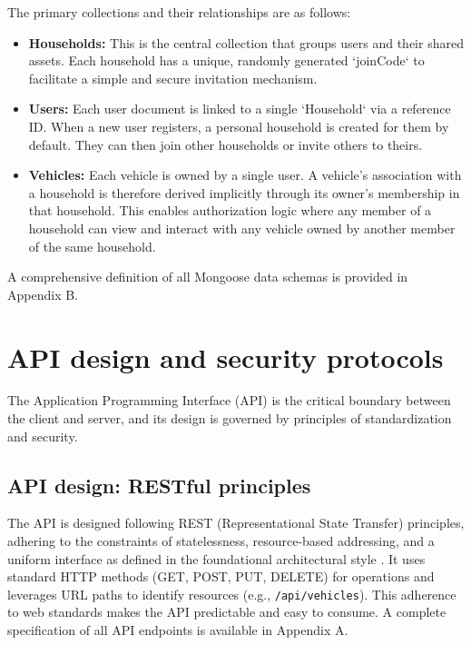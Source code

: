 The primary collections and their relationships are as follows:
\begin{itemize}
    \item \textbf{Households:} This is the central collection that groups users and their shared assets. Each household has a unique, randomly generated `joinCode` to facilitate a simple and secure invitation mechanism.
    \item \textbf{Users:} Each user document is linked to a single `Household` via a reference ID. When a new user registers, a personal household is created for them by default. They can then join other households or invite others to theirs.
    \item \textbf{Vehicles:} Each vehicle is owned by a single user. A vehicle's association with a household is therefore derived implicitly through its owner's membership in that household. This enables authorization logic where any member of a household can view and interact with any vehicle owned by another member of the same household.
\end{itemize}
A comprehensive definition of all Mongoose data schemas is provided in Appendix B.

\section{API design and security protocols}
The Application Programming Interface (API) is the critical boundary between the client and server, and its design is governed by principles of standardization and security.

\subsection{API design: RESTful principles}
The API is designed following REST (Representational State Transfer) principles, adhering to the constraints of statelessness, resource-based addressing, and a uniform interface as defined in the foundational architectural style \cite{Fielding2000REST}. It uses standard HTTP methods (GET, POST, PUT, DELETE) for operations and leverages URL paths to identify resources (e.g., \texttt{/api/vehicles}). This adherence to web standards makes the API predictable and easy to consume. A complete specification of all API endpoints is available in Appendix A.


